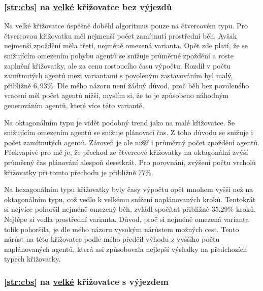 

\subsubsection{\ref{str:cbs} na \hyperref[par:data_velka]{velké} křižovatce bez výjezdů}
\label{subsubsec:exp_cbssg_velka_krizovatka_bez_vyjezdu}

Na velké křižovatce úspěšně doběhl algoritmus pouze na čtvercovém typu.
Pro čtvercovou křižovatku měl nejmenší počet zamítnutí prostřední běh.
Avšak nejmenší zpoždění měla třetí, nejméně omezená varianta.
Opět zde platí, že se snižujícím omezením pohybu agentů se snižuje průměrné zpoždění
a roste zaplnění křižovatky, ale za cenu rostoucího času výpočtu.
Rozdíl v počtu zamítnutých agentů mezi variantami s povoleným zastavováním byl malý, přibližně $6,93\%$.
Dle mého názoru není žádný důvod, proč běh bez povoleného vracení měl počet agentů nižší,
myslím si, že to je způsobeno náhodným generováním agentů, které více  této variantě.

Na oktagonálním typu je vidět podobný trend jako na malé křižovatce.
Se snižujícím omezením agentů se snižuje plánovací čas.
Z toho důvodu se snižuje i počet zamítnutých agentů.
Zároveň je ale nižší i průměrný počet zpoždění agentů.
Překvapivé pro mě je, že přechod ze čtvercové křižovatky na oktagonální zvýší průměrný čas plánování alespoň desetkrát.
Pro porovnání, zvýšení počtu vrcholů křižovatky při tomto přechodu je přibližně $77\%$.

Na hexagonálním typu křižovatky byly časy výpočtu opět mnohem vyšší než na oktagonálním typu,
což vedlo k velkému snížení naplánovaných kroků.
Tentokrát si nejvíce pohoršil nejméně omezený běh, zvládl spočítat přibližně $35.29\%$ kroků.
Nejlépe si vedla prostřední varianta.
Důvod, proč si nejméně omezená varianta tolik pohoršila, je dle mého názoru vysokým nárůstem možných cest.
Tento nárůst na této křižovatce podle mého předčil výhodu z vyššího počtu naplánovaných agentů,
která asi způsobovala nejlepší výsledky na předchozích typech křižovatky.



\subsubsection{\ref{str:cbs} na \hyperref[par:data_velka]{velké} křižovatce s výjezdem}
\label{subsubsec:exp_cbssg_velka_krizovatka_s_vyjezdem}

